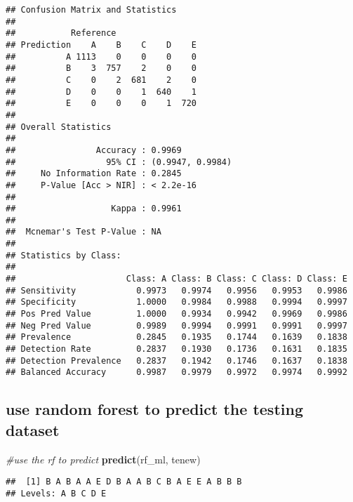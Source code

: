 \documentclass[]{article}
\newenvironment{Shaded}{\begin{snugshade}}{\end{snugshade}}
\newcommand{\CommentTok}[1]{\textcolor[rgb]{0.56,0.35,0.01}{\textit{#1}}}
\newcommand{\KeywordTok}[1]{\textcolor[rgb]{0.13,0.29,0.53}{\textbf{#1}}}
\newcommand{\NormalTok}[1]{#1}
\begin{document}
\begin{verbatim}
## Confusion Matrix and Statistics
## 
##           Reference
## Prediction    A    B    C    D    E
##          A 1113    0    0    0    0
##          B    3  757    2    0    0
##          C    0    2  681    2    0
##          D    0    0    1  640    1
##          E    0    0    0    1  720
## 
## Overall Statistics
##                                           
##                Accuracy : 0.9969          
##                  95% CI : (0.9947, 0.9984)
##     No Information Rate : 0.2845          
##     P-Value [Acc > NIR] : < 2.2e-16       
##                                           
##                   Kappa : 0.9961          
##                                           
##  Mcnemar's Test P-Value : NA              
## 
## Statistics by Class:
## 
##                      Class: A Class: B Class: C Class: D Class: E
## Sensitivity            0.9973   0.9974   0.9956   0.9953   0.9986
## Specificity            1.0000   0.9984   0.9988   0.9994   0.9997
## Pos Pred Value         1.0000   0.9934   0.9942   0.9969   0.9986
## Neg Pred Value         0.9989   0.9994   0.9991   0.9991   0.9997
## Prevalence             0.2845   0.1935   0.1744   0.1639   0.1838
## Detection Rate         0.2837   0.1930   0.1736   0.1631   0.1835
## Detection Prevalence   0.2837   0.1942   0.1746   0.1637   0.1838
## Balanced Accuracy      0.9987   0.9979   0.9972   0.9974   0.9992
\end{verbatim}

\hypertarget{use-random-forest-to-predict-the-testing-dataset}{%
\subsection{use random forest to predict the testing
dataset}\label{use-random-forest-to-predict-the-testing-dataset}}

\begin{Shaded}
\begin{Highlighting}[]
\CommentTok{#use the rf to predict}
\KeywordTok{predict}\NormalTok{(rf_ml, tenew)}
\end{Highlighting}
\end{Shaded}

\begin{verbatim}
##  [1] B A B A A E D B A A B C B A E E A B B B
## Levels: A B C D E
\end{verbatim}
\end{document}
